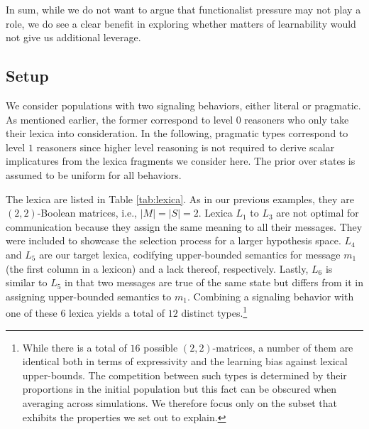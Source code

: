 \documentclass[a4paper]{article}
\begin{document}
In sum, while we do not want to argue that functionalist pressure may not play a role, we do see a clear benefit in exploring whether matters of learnability would not give us additional leverage.

\subsection{Setup}
 We consider populations with two signaling behaviors, either literal or pragmatic. As mentioned earlier, the former correspond to level $0$ reasoners who only take their lexica into consideration. In the following, pragmatic types correspond to level $1$ reasoners since higher level reasoning is not required to derive scalar implicatures from the lexica fragments we consider here. The prior over states is assumed to be uniform for all behaviors.    

The lexica are listed in Table \ref{tab:lexica}. As in our previous examples, they are $(2,2)$-Boolean matrices, i.e., $|M| = |S| = 2$. Lexica $L_1$ to $L_3$ are not optimal for communication because they assign the same meaning to all their messages. They were included to showcase the selection process for a larger hypothesis space. $L_4$ and $L_5$ are our target lexica, codifying upper-bounded semantics for message $m_1$ (the first column in a lexicon) and a lack thereof, respectively. Lastly, $L_6$ is similar to $L_5$ in that two messages are true of the same state but differs from it in assigning upper-bounded semantics to $m_1$. Combining a signaling behavior with one of these $6$ lexica yields a total of $12$ distinct types.\footnote{While there is a total of $16$ possible $(2,2)$-matrices, a number of them are identical both in terms of expressivity and the learning bias against lexical upper-bounds. The competition between such types is determined by their  proportions in the initial population but this fact can be obscured when averaging across simulations. We therefore focus only on the subset that exhibits the properties we set out to explain.}
\end{document}

